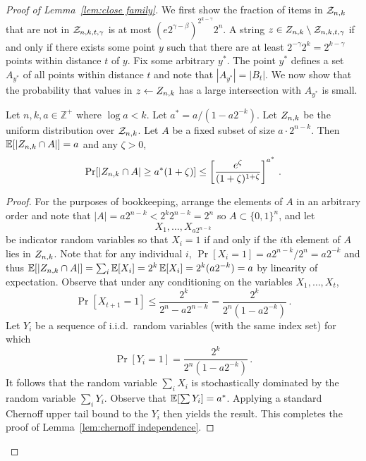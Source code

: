 

 
\begin{proof}[Proof of Lemma~\ref{lem:close family}]
We first show the fraction of items in $\mathcal{Z}_{n,k}$ that are not in $\mathcal{Z}_{n,k,t,\gamma}$ is at most $\left(e2^{\gamma-\beta}\right)^{2^{k-\gamma}}2^n$.  
A string $z\in Z_{n,k}\setminus \mathcal{Z}_{n,k,t,\gamma}$ if and only if there exists some point $y$ such that there are at least $2^{-\gamma}2^k = 2^{k-\gamma}$ points within distance $t$ of $y$.  Fix some arbitrary $y^*$. The point $y^*$ defines a set $A_{y^*}$ of all points within distance $t$ and note that $|A_{y^*}| = |B_t|$.  We now show that the probability that values in $z\leftarrow Z_{n,k}$ has a large intersection with $A_{y^*}$ is small.  

  \begin{lemma}
  \label{lem:chernoff independence}
  Let $n,k,a\in\mathbb{Z}^+$ where $\log a < k$.  Let $a^* = a/(1 - a2^{-k})$. Let $Z_{n,k}$
  be the uniform distribution over $\mathcal{Z}_{n,k}$. Let $A$ be a fixed subset of size $a \cdot 2^{n-k}$. Then
  $\operatorname*{\mathbb{E}}[|Z_{n,k} \cap A|] = a$ and any $\zeta > 0$,
  \[
    \Pr[|Z_{n,k} \cap A| \geq a^*(1 + \zeta)] \leq \left[\frac{e^\zeta}{(1+\zeta)^{1+\zeta}}\right]^{a^*}\,.
  \]
\end{lemma}
\begin{proof}
  For the purposes of bookkeeping, arrange the elements of $A$ in an
  arbitrary order and note that $|A| = a2^{n-k} < 2^k2^{n-k} = 2^n$ so $A\subset \{0,1\}^n$, and let
  \[
    X_1, \ldots, X_{a2^{n-k}}
  \]
  be indicator random variables so that $X_i = 1$ if and only if the
  $i$th element of $A$ lies in $Z_{n,k}$.  Note that for any individual $i$, $\Pr[X_i =1] =a2^{n-k}/2^n = a2^{-k}$ and thus $\operatorname*{\mathbb{E}}[|Z_{n,k}\cap A|] =\sum_i \operatorname*{\mathbb{E}}[X_i] = 2^k \operatorname*{\mathbb{E}}[X_i] =2^k (a2^{-k})= a$ by linearity of expectation.  Observe that under any conditioning on the
  variables $X_1, \ldots, X_t$,
  \[
    \Pr[X_{t+1} = 1] \leq \frac{2^k}{2^n - a2^{n-k}} = \frac{2^k}{2^n(1 - a2^{-k})}\,.
  \]
   Let $Y_i$ be a sequence of
  i.i.d.\ random variables (with the same index set) for which
  \[
    \Pr[Y_i = 1] = \frac{2^{k}}{2^n(1 - a2^{-k})}\,.
  \]It follows that the random variable $\sum_i X_i$ is stochastically
  dominated by the random variable $\sum_i Y_i$. Observe that
  $\operatorname*{\mathbb{E}}[\sum Y_i] = a^*$. Applying a standard Chernoff upper tail
  bound to the $Y_i$ then yields the result. This completes the proof of Lemma~\ref{lem:chernoff independence}.
\end{proof}


\end{proof}
